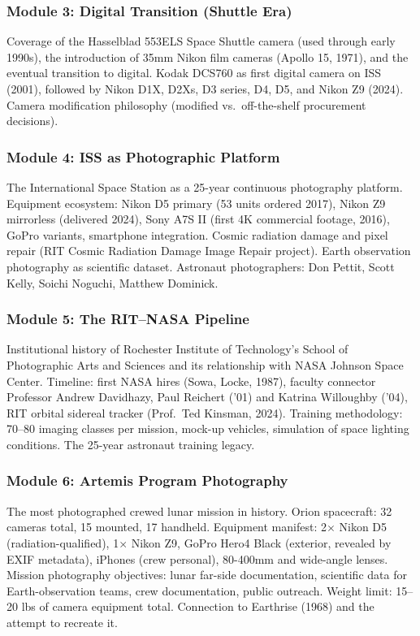 \documentclass[11pt,letterpaper]{article}
\begin{document}
\subsubsection{Module 3: Digital Transition (Shuttle Era)}
Coverage of the Hasselblad 553ELS Space Shuttle camera (used through early 1990s), the introduction of 35mm Nikon film cameras (Apollo 15, 1971), and the eventual transition to digital. Kodak DCS760 as first digital camera on ISS (2001), followed by Nikon D1X, D2Xs, D3 series, D4, D5, and Nikon Z9 (2024). Camera modification philosophy (modified vs.\ off-the-shelf procurement decisions).

\subsubsection{Module 4: ISS as Photographic Platform}
The International Space Station as a 25-year continuous photography platform. Equipment ecosystem: Nikon D5 primary (53 units ordered 2017), Nikon Z9 mirrorless (delivered 2024), Sony A7S II (first 4K commercial footage, 2016), GoPro variants, smartphone integration. Cosmic radiation damage and pixel repair (RIT Cosmic Radiation Damage Image Repair project). Earth observation photography as scientific dataset. Astronaut photographers: Don Pettit, Scott Kelly, Soichi Noguchi, Matthew Dominick.

\subsubsection{Module 5: The RIT--NASA Pipeline}
Institutional history of Rochester Institute of Technology's School of Photographic Arts and Sciences and its relationship with NASA Johnson Space Center. Timeline: first NASA hires (Sowa, Locke, 1987), faculty connector Professor Andrew Davidhazy, Paul Reichert ('01) and Katrina Willoughby ('04), RIT orbital sidereal tracker (Prof.\ Ted Kinsman, 2024). Training methodology: 70--80 imaging classes per mission, mock-up vehicles, simulation of space lighting conditions. The 25-year astronaut training legacy.

\subsubsection{Module 6: Artemis Program Photography}
The most photographed crewed lunar mission in history. Orion spacecraft: 32 cameras total, 15 mounted, 17 handheld. Equipment manifest: 2$\times$ Nikon D5 (radiation-qualified), 1$\times$ Nikon Z9, GoPro Hero4 Black (exterior, revealed by EXIF metadata), iPhones (crew personal), 80-400mm and wide-angle lenses. Mission photography objectives: lunar far-side documentation, scientific data for Earth-observation teams, crew documentation, public outreach. Weight limit: 15--20 lbs of camera equipment total. Connection to Earthrise (1968) and the attempt to recreate it.
\end{document}
